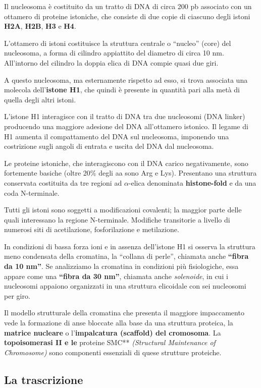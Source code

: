 \documentclass[]{article}
\begin{document}
Il nucleosoma è costituito da un tratto di DNA di circa 200 pb associato
con un ottamero di proteine istoniche, che consiste di due copie di
ciascuno degli istoni \textbf{H2A}, \textbf{H2B}, \textbf{H3} e
\textbf{H4}.

L'ottamero di istoni costituisce la struttura centrale o ``nucleo''
(core) del nucleosoma, a forma di cilindro appiattito del diametro di
circa 10 nm. All'intorno del cilindro la doppia elica di DNA compie
quasi due giri.

A questo nucleosoma, ma esternamente rispetto ad esso, si trova
associata una molecola dell'\textbf{istone H1}, che quindi è presente in
quantità pari alla metà di quella degli altri istoni.

L'istone H1 interagisce con il tratto di DNA tra due nucleosomi (DNA
linker) producendo una maggiore adesione del DNA all'ottamero istonico.
Il legame di H1 aumenta il compattamento del DNA sul nucleosoma,
imponendo una costrizione sugli angoli di entrata e uscita del DNA dal
nucleosoma.

Le proteine istoniche, che interagiscono con il DNA carico
negativamente, sono fortemente basiche (oltre 20\% degli aa sono Arg e
Lys). Presentano una struttura conservata costituita da tre regioni ad
\(\alpha\)-elica denominata \textbf{histone-fold} e da una coda
N-terminale.

Tutti gli istoni sono soggetti a modificazioni covalenti; la maggior
parte delle quali interessano la regione N-terminale. Modifiche
transitorie a livello di numerosi siti di acetilazione, fosforilazione e
metilazione.

In condizioni di bassa forza ioni e in assenza dell'istone H1 si osserva
la struttura meno condensata della cromatina, la ``collana di perle'',
chiamata anche \textbf{``fibra da 10 nm''}. Se analizziamo la cromatina
in condizioni più fisiologiche, essa appare come una \textbf{``fibra da
30 nm''}, chiamata anche \emph{solenoide}, in cui i nucleosomi appaiono
organizzati in una struttura elicoidale con sei nucleosomi per giro.

Il modello strutturale della cromatina che presenta il maggiore
impaccamento vede la formazione di anse bloccate alla base da una
struttura proteica, la \textbf{matrice nucleare} o l'\textbf{impalcatura
(scaffold) del cromosoma}. La \textbf{topoisomerasi II e le }proteine
SMC** \emph{(Structural Maintenance of Chromosome)} sono componenti
essenziali di quese strutture proteiche.

\subsection{La trascrizione}\label{la-trascrizione}
\end{document}
